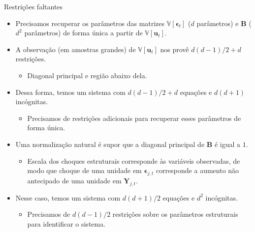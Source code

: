 \documentclass[11pt]{beamer}
\begin{document}
\begin{frame}{Restrições faltantes}
	\begin{itemize}
		\item Precisamos recuperar os parâmetros das matrizes $\mathbb{V}[\boldsymbol{\epsilon}_t]$ ($d$ parâmetros) e $\boldsymbol{B}$ ($d^2$ parâmetros) de {\color{blue}forma única} a partir de $\mathbb{V}[\boldsymbol{u}_t]$.
		\item A observação (em amostras grandes) de $\mathbb{V}[\boldsymbol{u}_t]$ nos provê $d(d-1)/2 + d$ restrições.
		\begin{itemize}
			\item Diagonal principal e região abaixo dela.
		\end{itemize}
		\item Dessa forma, temos um sistema com $d(d-1)/2 + d$ equações e $d(d+1)$ incógnitas.
		\begin{itemize}
			\item Precisamos de restrições adicionais para recuperar esses parâmetros de forma única.
		\end{itemize}
		\item Uma normalização natural é supor que a diagonal principal de $\boldsymbol{B}$ é igual a $1$.
		\begin{itemize}
			\item {\color{blue}Escala dos choques estruturais corresponde às variáveis observadas}, de modo que choque de uma unidade em $\boldsymbol{\epsilon}_{j,t}$ corresponde a aumento não antecipado de uma unidade em $\boldsymbol{Y}_{j,t}$.
		\end{itemize}
		\item Nesse caso, temos um sistema com $d(d+1)/2$ equações e $d^2$ incógnitas.
		\begin{itemize}
			\item Precisamos de  {\color{blue}$d(d-1)/2$} restrições sobre os parâmetros estruturais para identificar o sistema. 
		\end{itemize}
		
	\end{itemize}
\end{frame}
\end{document}
